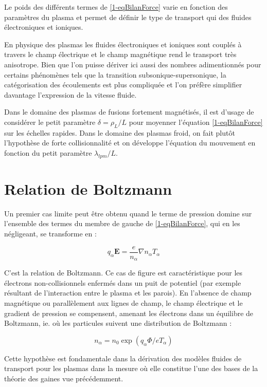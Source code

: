 \begin{refsection}
Le poids des différents termes de \eqref{1-eqBilanForce} varie en fonction des
paramètres du plasma et permet de définir le type de transport qui des fluides
électroniques et ioniques.

En physique des plasmas les fluides électroniques et ioniques sont couplés à
travers le champ électrique et le champ magnétique rend le transport très
anisotrope. Bien que l'on puisse dériver ici aussi des nombres
adimentionnés pour certains phénomènes tels que la transition
subsonique-supersonique, la catégorisation des écoulements est plus compliquée
et l'on préfère simplifier davantage l'expression de la vitesse fluide.

Dans le domaine des plasmas de fusions fortement magnétisés, il est d'usage de
considérer le petit paramètre $\delta=\rho_L/L$ pour moyenner l'équation
\eqref{1-eqBilanForce} sur les échelles rapides. Dans le domaine des plasmas
froid, on fait plutôt l'hypothèse de forte collisionnalité et on développe
l'équation du mouvement en fonction du petit paramètre $\lambda_{lpm}/L$.

\section{Relation de Boltzmann}

Un premier cas limite peut être obtenu quand le terme de pression domine
sur l'ensemble des termes du membre de gauche de \eqref{1-eqBilanForce}, qui en
les négligeant, se transforme en :

\begin{equation}
\label{1-equilibreBoltzman}
q_\alpha\mathbf
E =\frac{e}{n_\alpha}\nabla n_\alpha T_\alpha
\end{equation}

C'est la relation de Boltzmann. Ce cas de figure est caractéristique pour les
électrons non-collisionnels enfermés dans un puit de potentiel (par exemple résultant de
l'interaction entre le plasma et les parois). En l'absence de champ magnétique
ou parallèlement aux lignes de champ, le champ électrique et le gradient de
pression se compensent, amenant les électrons dans un équilibre de Boltzmann,
ie. où les particules suivent une distribution de Boltzmann :

\begin{equation}
\label{1-profilBoltzman}
n_\alpha=n_0\exp(q_\alpha \Phi/eT_\alpha)
\end{equation}

Cette hypothèse est fondamentale dans la dérivation des modèles fluides de
transport pour les plasmas dans la mesure où elle constitue l'une des bases de
la théorie des gaines vue précédemment. 


\end{refsection}
